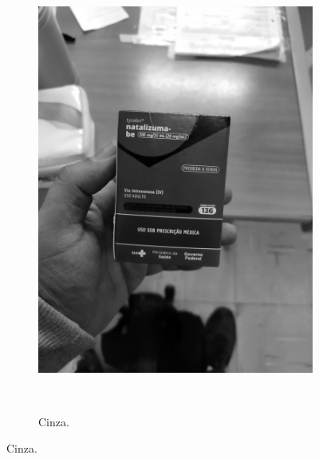 \begin{figure}[htb]
\begin{subfigure}[t]{0.21\textwidth}
        \includegraphics[width=\linewidth]{../pictures/tysabri_rgb_b_only.jpg}
    \end{subfigure}
    \\\vspace{\floatsep}
    \begin{subfigure}[t]{0.21\textwidth}
        \centering
        \caption{Cinza.}
        \label{fig:foto:versoes:1:Cinza:boxes}

\end{subfigure}
\end{figure}

